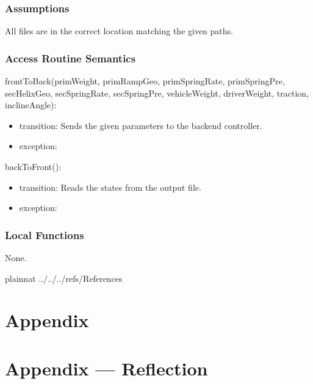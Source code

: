 \documentclass[12pt, titlepage]{article}
\begin{document}
\subsubsection{Assumptions}

All files are in the correct location matching the given paths.

\subsubsection{Access Routine Semantics}

\noindent frontToBack(primWeight, primRampGeo, primSpringRate, primSpringPre, secHelixGeo, secSpringRate, secSpringPre, vehicleWeight, driverWeight, traction, inclineAngle):
\begin{itemize}
\item transition: Sends the given parameters to the backend controller.
\item exception:  
\end{itemize}

\noindent backToFront():
\begin{itemize}
  \item transition: Reads the states from the output file.
  \item exception: 
\end{itemize}

\subsubsection{Local Functions}

None.

\newpage

 {plainnat}
 {../../../refs/References}

\newpage

\section{Appendix} \label{Appendix}


\newpage{}

\section*{Appendix --- Reflection}

\end{document}

